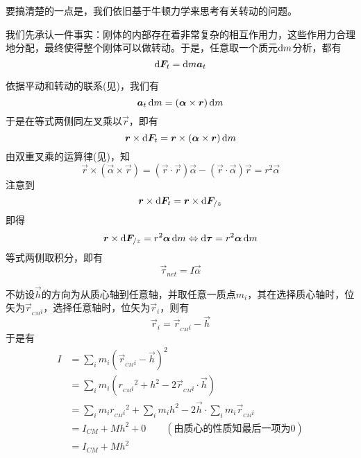 \chapter[转动动力学]{}
\vspace*{-4ex}
\begin{prove}[Concepts in Dynamics\qquad$\vec{\tau}_{net}=I\vec{\alpha}$]
    要搞清楚的一点是，我们依旧基于牛顿力学来思考有关转动的问题。

    我们先承认一件事实：刚体的内部存在着非常复杂的相互作用力，这些作用力合理地分配，最终使得整个刚体可以做转动。于是，任意取一个质元$\dif m$分析，都有\[\dif \vec{F}_t=\dif m\vec{a}_t\]

    依据平动和转动的联系(见)，我们有
    \[\vec{a}_t\dif m=(\vec{\alpha}\times\vec{r})\dif m\]
    于是在等式两侧同左叉乘以$\vec{r}$，即有
    \[\vec{r}\times\dif\vec{F}_t= \vec{r}\times(\vec{\alpha}\times\vec{r})\dif m\]
    由双重叉乘的运算律(见)，知
    \[\vec{r}\times(\vec{\alpha}\times\vec{r})=(\vec{r}\cdot\vec{r})\vec{\alpha}-(\vec{r}\cdot\vec{\alpha})\vec{r}=r^2\vec{\alpha}\]
    注意到
    \[\vec{r}\times\dif\vec{F}_t=\vec{r}\times\dif\vec{F}_{/z}\]
    即得
    \[\vec{r}\times\dif\vec{F}_{/z}=r^2\vec{\alpha}\dif m\Leftrightarrow\dif\vec{\tau}=r^2\vec{\alpha}\dif m\]
    等式两侧取积分，即有
    \[\vec{\tau}_{net}=I\vec{\alpha}\]
\end{prove}
\begin{prove}[\itr{Parallel Axis Theorem}{平行轴定理}\qquad$I=I_{CM}+Mh^2$]
    不妨设$\vec{h}$的方向为从质心轴到任意轴，并取任意一质点$m_i$，其在选择质心轴时，位矢为$\vec{r}_{_{CM}i}$，选择任意轴时，位矢为$\vec{r}_i$，则有\[\vec{r}_i=\vec{r}_{_{CM}i}-\vec{h}\]
    于是有
    \begin{align*}
        I & =\sum_{i}m_i(\vec{r}_{_{CM}i}-\vec{h})^2                                           \\
          & =\sum_{i}m_i(r_{_{CM}i}{}^2+h^2-2\vec{r}_{_{CM}i}\cdot\vec{h})                     \\
          & =\sum_{i}m_ir_{_{CM}i}{}^2+\sum_{i}m_ih^2-2\vec{h}\cdot\sum_{i}m_i\vec{r}_{_{CM}i} \\
          & =I_{CM}+Mh^2+0\qquad(\text{由质心的性质知最后一项为0})                                         \\
          & =I_{CM}+Mh^2
    \end{align*}
\end{prove}
